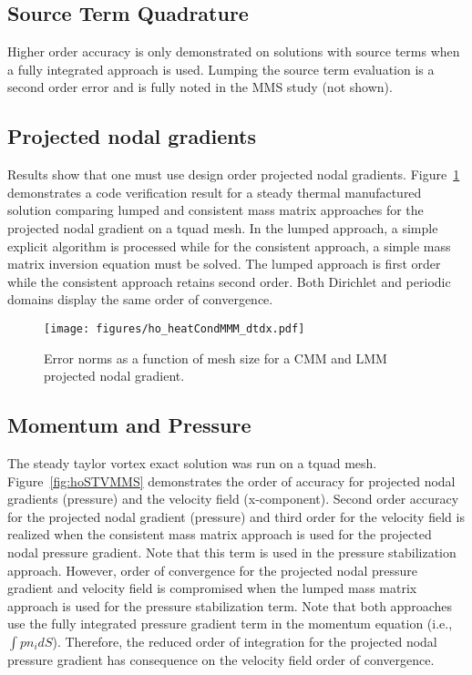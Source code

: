 \subsection{Source Term Quadrature}
Higher order accuracy is only demonstrated on solutions with source terms when a fully integrated
approach is used. Lumping the source term evaluation is a second order error and is fully noted in
the MMS study (not shown).

\subsection{Projected nodal gradients}
Results show that one must use design order projected nodal gradients. Figure~\ref{fig:pngTempMMS} demonstrates 
a code verification result for a steady thermal manufactured solution comparing lumped and consistent mass
matrix approaches for the projected nodal gradient on a tquad mesh. In the lumped approach, a simple 
explicit algorithm is processed while for the consistent approach, a simple mass matrix inversion equation 
must be solved. The lumped approach is first order while the consistent approach retains second order. Both
Dirichlet and periodic domains display the same order of convergence.

\begin{figure}
\centerline{\texttt{[image: figures/ho\_heatCondMMM\_dtdx.pdf]}}
\caption{Error norms as a function of mesh size for a CMM and LMM projected nodal gradient.}
\label{fig:pngTempMMS}
\end{figure}

\subsection{Momentum and Pressure}
The steady taylor vortex exact solution was run on a tquad mesh. Figure~\ref{fig:hoSTVMMS} demonstrates 
the order of accuracy for projected nodal gradients (pressure) and the velocity field (x-component). 
Second order accuracy for the projected nodal gradient (pressure) and third order for the velocity field
is realized when the consistent mass matrix approach is used for the projected nodal pressure gradient. 
Note that this term is used in the pressure stabilization approach. However, order of convergence for 
the projected nodal pressure gradient and velocity field is compromised when the lumped mass matrix approach
is used for the pressure stabilization term. Note that both approaches use the fully integrated pressure
gradient term in the momentum equation (i.e., $\int p n_i dS$). Therefore, the reduced order of integration
for the projected nodal pressure gradient has consequence on the velocity field order of convergence.
 
